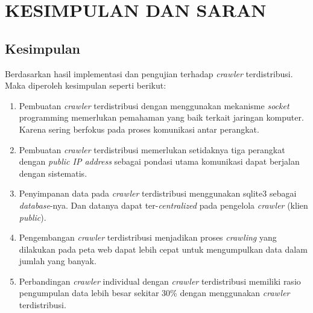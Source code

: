 
\chapter{KESIMPULAN DAN SARAN}

\section{Kesimpulan}
Berdasarkan hasil implementasi dan pengujian terhadap \emph{crawler} terdistribusi. Maka diperoleh kesimpulan seperti berikut:

\begin{enumerate}
	\item Pembuatan \emph{crawler} terdistribusi dengan menggunakan mekanisme \emph{socket} programming memerlukan pemahaman yang baik terkait jaringan komputer. Karena sering berfokus pada proses komunikasi antar perangkat.

	\item Pembuatan \emph{crawler} terdistribusi memerlukan setidaknya tiga perangkat dengan \emph{public IP address} sebagai pondasi utama komunikasi dapat berjalan dengan sistematis.

	\item Penyimpanan data pada \emph{crawler} terdistribusi menggunakan sqlite3 sebagai \emph{database}-nya. Dan datanya dapat ter-\emph{centralized} pada pengelola \emph{crawler} (klien \emph{public}).

	\item Pengembangan \emph{crawler} terdistribusi menjadikan proses \emph{crawling} yang dilakukan pada peta web dapat lebih cepat untuk mengumpulkan data dalam jumlah yang banyak.

	\item Perbandingan \emph{crawler} individual dengan \emph{crawler} terdistribusi memiliki rasio pengumpulan data lebih besar sekitar 30\% dengan menggunakan \emph{crawler} terdistribusi.
\end{enumerate}

\clearpage
